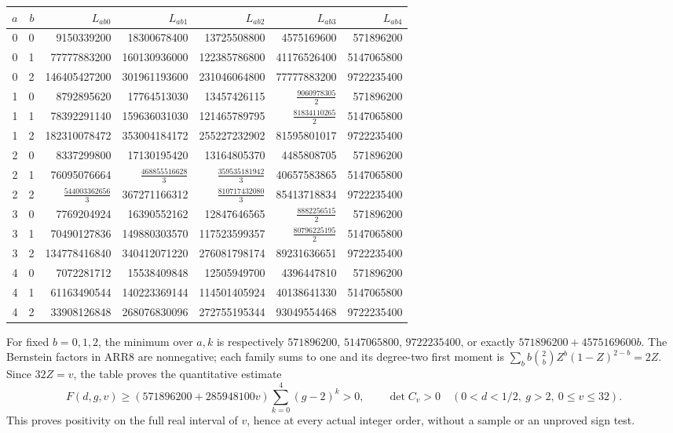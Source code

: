 \begin{center}
\scriptsize
\begin{tabular}{rr|rrrrr}
$a$&$b$&$L_{ab0}$&$L_{ab1}$&$L_{ab2}$&$L_{ab3}$&$L_{ab4}$\\\hline
0&0&9150339200&18300678400&13725508800&4575169600&571896200\\
0&1&77777883200&160130936000&122385786800&41176526400&5147065800\\
0&2&146405427200&301961193600&231046064800&77777883200&9722235400\\
1&0&8792895620&17764513030&13457426115&$\frac{9060978305}{2}$&571896200\\
1&1&78392291140&159636031030&121465789795&$\frac{81834110265}{2}$&5147065800\\
1&2&182310078472&353004184172&255227232902&81595801017&9722235400\\
2&0&8337299800&17130195420&13164805370&4485808705&571896200\\
2&1&76095076664&$\frac{468855516628}{3}$&$\frac{359535181942}{3}$&40657583865&5147065800\\
2&2&$\frac{544003362656}{3}$&367271166312&$\frac{810717432080}{3}$&85413718834&9722235400\\
3&0&7769204924&16390552162&12847646565&$\frac{8882256515}{2}$&571896200\\
3&1&70490127836&149880303570&117523599357&$\frac{80796225195}{2}$&5147065800\\
3&2&134778416840&340412071220&276081798174&89231636651&9722235400\\
4&0&7072281712&15538409848&12505949700&4396447810&571896200\\
4&1&61163490544&140223369144&114501405924&40138641330&5147065800\\
4&2&33908126848&268076830096&272755195344&93049554468&9722235400\\
\end{tabular}
\end{center}

For fixed $b=0,1,2$, the minimum over $a,k$ is respectively
$571896200$, $5147065800$, $9722235400$, or exactly
$571896200+4575169600b$. The Bernstein factors in ARR8 are
nonnegative; each family sums to one and its degree-two first
moment is $\sum_b b\binom2bZ^b(1-Z)^{2-b}=2Z$.
Since $32Z=v$, the table proves the quantitative estimate
\[
 F(d,g,v)\ge(571896200+285948100v)\sum_{k=0}^4(g-2)^k>0,
 \qquad\det C_v>0
 \quad(0<d<1/2,\ g>2,\ 0\le v\le32).
 \tag{ARR9}
\]
This proves positivity on the full real interval of $v$, hence at
every actual integer order, without a sample or an unproved sign test.

